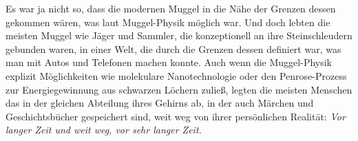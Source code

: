 Es war ja nicht so, dass die modernen Muggel in die Nähe der Grenzen dessen gekommen wären, was laut Muggel-Physik möglich war. Und doch lebten die meisten Muggel wie Jäger und Sammler, die konzeptionell an ihre Steinschleudern gebunden waren, in einer Welt, die durch die Grenzen dessen definiert war, was man mit Autos und Telefonen machen konnte. Auch wenn die Muggel-Physik explizit Möglichkeiten wie molekulare Nanotechnologie oder den Penrose-Prozess zur Energiegewinnung aus schwarzen Löchern zuließ, legten die meisten Menschen das in der gleichen Abteilung ihres Gehirns ab, in der auch Märchen und Geschichtsbücher gespeichert sind, weit weg von ihrer persönlichen Realität: \emph{Vor langer Zeit und weit weg, vor sehr langer Zeit.}
